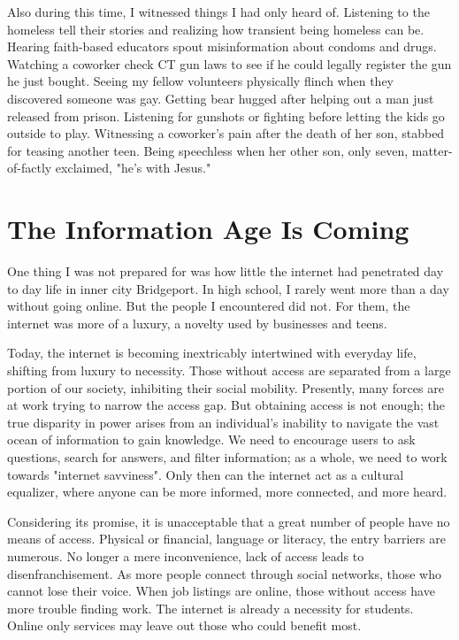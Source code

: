 Also during this time, I witnessed things I had only heard of. Listening
to the homeless tell their stories and realizing how transient being
homeless can be. Hearing faith-based educators spout misinformation
about condoms and drugs. Watching a coworker check CT gun laws to see
if he could legally register the gun he just bought. Seeing my fellow
volunteers physically flinch when they discovered someone was gay.
Getting bear hugged after helping out a man just released from prison.
Listening for gunshots or fighting before letting the kids go outside to
play. Witnessing a coworker's pain after the death of her son, stabbed
for teasing another teen. Being speechless when her other son, only
seven, matter-of-factly exclaimed, "he's with Jesus."


\section*{The Information Age Is Coming}

One thing I was not prepared for was how little the internet had
penetrated day to day life in inner city Bridgeport. In high school,
I rarely went more than a day without going online. But the people I
encountered did not. For them, the internet was more of a luxury, a
novelty used by businesses and teens.

Today, the internet is becoming inextricably intertwined with everyday
life, shifting from luxury to necessity. Those without access are
separated from a large portion of our society, inhibiting their social
mobility. Presently, many forces are at work trying to narrow the access
gap. But obtaining access is not enough; the true disparity in power
arises from an individual's inability to navigate the vast ocean of
information to gain knowledge. We need to encourage users to ask questions,
search for answers, and filter information; as a whole, we need to work
towards "internet savviness". Only then can the internet act as a cultural
equalizer, where anyone can be more informed, more connected, and more
heard.



Considering its promise, it is unacceptable that a great number of
people have no means of access. Physical or financial, language
or literacy, the entry barriers are numerous. No longer a mere
inconvenience, lack of access leads to disenfranchisement. As more
people connect through social networks, those who cannot lose their
voice. When job listings are online, those without access have more
trouble finding work. The internet is already a necessity for students.
Online only services may leave out those who could benefit most.

